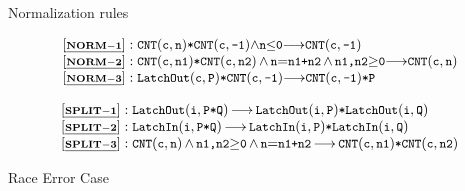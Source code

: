 \begin{frame}{Normalization rules}
\begin{center}
\begin{small}
\[
\begin{array}{l}
\BSPEC{\normrulen{1}:

\CNT{c}{n} {\sep} \CNT{c}{-1} {\wedge} \code{n\sm{\leq}0} {\longrightarrow} \CNT{c}{-1}}
\\
\BSPEC{\normrulen{2}:
\CNT{c}{n1} {\sep} \CNT{c}{n2}\, {\wedge}\, \code{n}{=}\code{n1{+}n2} \,{\wedge}\, \code{n1,n2}{\geq}\code{0} 
{\longrightarrow} \CNT{c}{n}}
\\
\BSPEC{\normrulen{3}:
\LatchOut{c}{P} {\sep} \CNT{c}{-1}  {\longrightarrow} \CNT{c}{-1}{\sep}\code{P}}
\end{array}
\]
\end{small}
\end{center}
\pause
\begin{small}
\[
\begin{array}{l}
\BSPEC{\splitrulen{1}:
\LatchOut{i}{P{\sep}Q} \,{\longrightarrow}\, \LatchOut{i}{P} {\sep}\LatchOut{i}{Q}}
\\
\BSPEC{\splitrulen{2}:
\LatchIn{i}{P{\sep}Q} \,{\longrightarrow}\, \LatchIn{i}{P} {\sep}\LatchIn{i}{Q}}
\\
\BSPEC{\splitrulen{3}:
\CNT{c}{n} \,{\wedge}\, %
\code{n1,n2}{\geq}\code{0}  \, {\wedge}\, \code{n}{=}\code{n1{+}n2} 
\,{\longrightarrow}\,
\CNT{c}{n1} {\sep} \CNT{c}{n2} }
\end{array}
\]
\end{small}
\end{frame}

\begin{frame}[shrink=17]{Race Error Case}
\pause
    
\end{frame}

